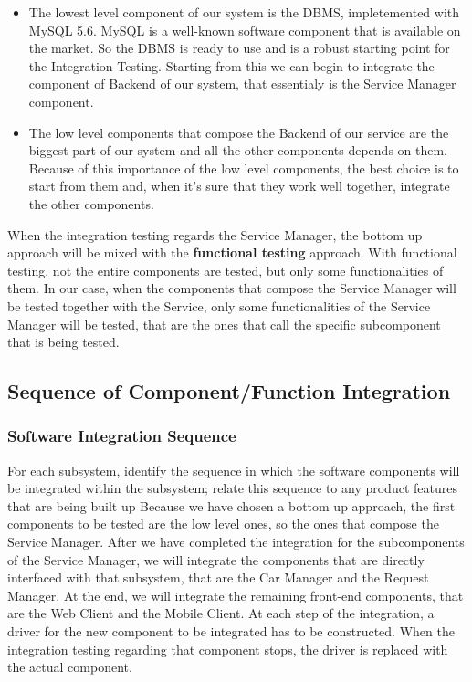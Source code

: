 \begin{itemize}
\item The lowest level component of our system is the DBMS, impletemented with MySQL 5.6. MySQL is a well-known software component that is available on the market. So the DBMS is ready to use and is a robust starting point for the Integration Testing. Starting from this we can begin to integrate the component of Backend of our system, that essentialy is the Service Manager component. 
\item The low level components that compose the Backend of our service are the biggest part of our system and all the other components depends on them. Because of this importance of the low level components, the best choice is to start from them and, when it's sure that they work well together, integrate the other components.
\end{itemize}  

When the integration testing regards the Service Manager, the bottom up approach will be mixed with the \textbf{functional testing} approach. With functional testing, not the entire components are tested, but only some functionalities of them. In our case, when the components that compose the Service Manager will be tested together with the Service, only some functionalities of the Service Manager will be tested, that are the ones that call the specific subcomponent that is being tested.
\subsection{Sequence of Component/Function Integration} 
\subsubsection{Software Integration Sequence} For each subsystem, identify the sequence in which the software components will be integrated within the subsystem; relate this sequence to any product features that are being built up
\newline
Because we have chosen a bottom up approach, the first components to be tested are the low level ones, so the ones that compose the Service Manager. After we have completed the integration for the subcomponents of the Service Manager, we will integrate the components that are directly interfaced with that subsystem, that are the Car Manager and the Request Manager. At the end, we will integrate the remaining front-end components, that are the Web Client and the Mobile Client.
At each step of the integration, a driver for the new component to be integrated has to be constructed. When the integration testing regarding that component stops, the driver is replaced with the actual component.
